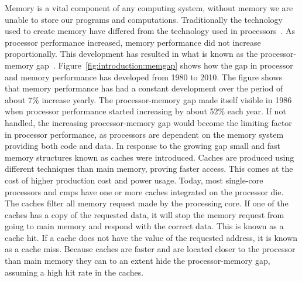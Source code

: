 Memory is a vital component of any computing system, without memory we are unable to store our programs and computations.
Traditionally the technology used to create memory have differed from the technology used in processors~\cite{Wilkes2001}.
As processor performance increased, memory performance did not increase proportionally.
This development has resulted in what is known as the processor-memory gap~\cite{Wilkes2001}.
Figure~\ref{fig:introduction:memgap} shows how the gap in processor and memory performance has developed from 1980 to 2010.
The figure shows that memory performance has had a constant development over the period of about 7\% increase yearly.
The processor-memory gap made itself visible in 1986 when processor performance started increasing by about 52\% each year.
If not handled, the increasing processor-memory gap would become the limiting factor in processor performance, as processors are dependent on the memory system providing both code and data.
In response to the growing gap small and fast memory structures known as caches were introduced.
Caches are produced using different techniques than main memory, proving faster access. 
This comes at the cost of higher production cost and power usage.
Today, most single-core processors and \glspl{cmp} have one or more caches integrated on the processor die.
The caches filter all memory request made by the processing core.
If one of the caches has a copy of the requested data, it will stop the memory request from going to main memory and respond with the correct data.
This is known as a cache hit.
If a cache does not have the value of the requested address, it is known as a cache miss.
Because caches are faster and are located closer to the processor than main memory they can to an extent hide the processor-memory gap, assuming a high hit rate in the caches.

